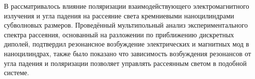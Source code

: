 В \cite{Evlyukhin2014} рассматривалось влияние поляризации взаимодействующего электромагнитного излучения и угла падения на рассеяние света кремниевыми наноцилиндрами субволновых размеров. Проведённый мультипольный анализ экспериментального спектра рассеяния, основанный на разложении по приближению дискретных диполей, подтвердил резонансное возбуждение электрических и магнитных мод в наноцилиндрах, также было показано что зависимость возбуждения резонансов от угла падения и поляризации позволяет управлять рассеянным светом в подобной системе.